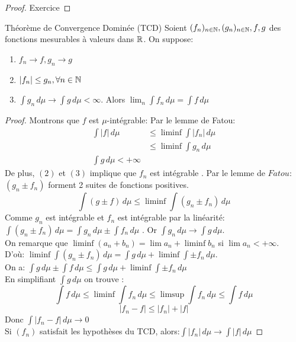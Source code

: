 \documentclass[]{report}
\begin{document}
    \begin{proof}{}{}
        Exercice
    \end{proof}

    \begin{tm}{Théorème de Convergence Dominée (TCD)}{}
        Soient $(f_n)_{n\in\mathbb{N}},(g_n)_{n\in\mathbb{N}},f,g$ des fonctions mesurables à valeurs dans $\mathbb{R}$. On suppose:
        \begin{enumerate}
            \item $f_n\to f, g_n\to g$
            \item $|f_n|\le g_n,\forall n\in\mathbb{N}$
            \item $\int g_n\,d\mu\to \int g\,d\mu<\infty$.
            Alors $\lim_n \int f_n\,d\mu=\int f\,d\mu$
        \end{enumerate}
    \end{tm}

    \begin{proof}{}{}
        Montrons que $f$ est $\mu$-intégrable: Par le lemme de Fatou:
        \begin{align*}
            \int |f|\,d\mu&\le\liminf\int |f_n|\,d\mu\\
            &\le \liminf\int g_n\,d\mu\\
            \int g\,d\mu<+\infty
        \end{align*}
        De plus, $(2)$ et $(3)$ implique que $f_n$ est intégrable \apcr. Par le lemme de $Fatou$: $(g_n\pm f_n)$ forment 2 suites de fonctions positives.\\
        \[\int (g\pm f)\,d\mu\le \liminf\int(g_n\pm f_n)\,d\mu\]
        Comme $g_n$ est intégrable et $f_n$ est intégrable \apcr par la linéarité: $\int (g_n\pm f_n)\,d\mu=\int g_n\,d\mu\pm\int f_n\,d\mu$ \apcr. Or $\int g_n\,d\mu\to \int g\,d\mu$.\\
        On remarque que $\liminf(a_n+b_n)=\lim a_n+\liminf b_n$ si $\lim a_n<+\infty$. \\
        D'où: $\liminf\int (g_n\pm f_n)\,d\mu=\int g\,d\mu+\liminf\int\pm f_n\,d\mu$.\\
        On a: $\int g\,d\mu\pm\int f\,d\mu\le \int g\,d\mu+\liminf\int\pm f_n\,d\mu$\\
        En simplifiant $\int g\,d\mu$ on trouve :
        \[\int f\,d\mu\le\liminf \int f_n\,d\mu\le\limsup \int f_n\,d\mu\le \int f\,d\mu\]
        \[|f_n-f|\le |f_n|+|f|\]
        Donc $\int |f_n-f|\,d\mu\to 0$\\
        Si $(f_n)$ satisfait les hypothèses du TCD, alors:$\int |f_n|\,d\mu\to \int|f|\,d\mu$
    \end{proof}
\end{document}
